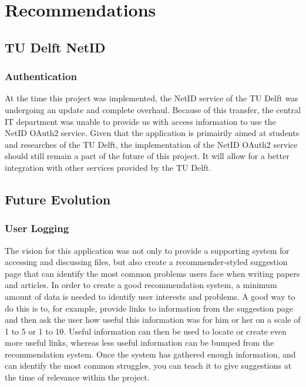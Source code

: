 \chapter{Recommendations}
\section{TU Delft NetID}

\subsection{Authentication}

At the time this project was implemented, the NetID service of the TU Delft was undergoing an update and complete overhaul. 
Because of this transfer, the central IT department was unable to provide us with access information to use the NetID OAuth2 service.
Given that the application is primairily aimed at students and researches of the TU Delft, the implementation of the NetID
OAuth2 service should still remain a part of the future of this project. It will allow for a better integration with other
services provided by the TU Delft.

\section{Future Evolution}

\subsection{User Logging}

The vision for this application was not only to provide a supporting system for accessing and discussing files, but also create
a recommender-styled suggestion page that can identify the most common problems users face when writing papers and articles.
In order to create a good recommendation system, a minimum amount of data is needed to identify user interests and problems.
A good way to do this is to, for example, provide links to information from the suggestion page and then ask the user
how useful this information was for him or her on a scale of 1 to 5 or 1 to 10. Useful information can then be used to locate
or create even more useful links, whereas less useful information can be bumped from the recommendation system. Once the system
has gathered enough information, and can identify the most common struggles, you can teach it to give suggestions at the time
of relevance within the project. 